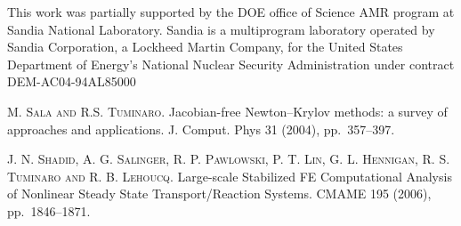 This work was partially supported by  the DOE office of Science AMR program at Sandia National Laboratory. Sandia is a multiprogram laboratory operated by Sandia Corporation, a Lockheed Martin Company, for the United States Department of Energy's National Nuclear Security Administration under contract DEM-AC04-94AL85000


\begin{thebibliography}{10}
\textsc{M. Sala and R.S. Tuminaro}. {Jacobian-free {N}ewton--{K}rylov methods: a survey of approaches and applications}. J. Comput. Phys 31 (2004), pp.~357--397.

\textsc{J. N. Shadid, A. G. Salinger, R. P. Pawlowski, P. T. Lin, G. L. Hennigan, R. S. Tuminaro and R. B. Lehoucq}. {Large-scale Stabilized FE Computational Analysis of Nonlinear Steady State Transport/Reaction Systems}. CMAME 195 (2006), pp.~1846--1871.


\end{thebibliography}

